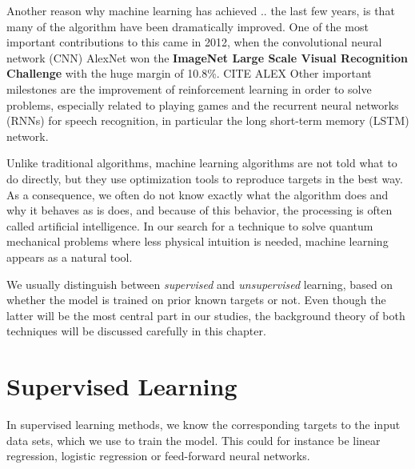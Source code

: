 Another reason why machine learning has achieved .. the last few years, is that many of the algorithm have been dramatically improved. One of the most important contributions to this came in 2012, when the convolutional neural network (CNN) AlexNet won the \textbf{ImageNet Large Scale Visual Recognition Challenge} with the huge margin of 10.8\%. CITE ALEX Other important milestones are the improvement of reinforcement learning in order to solve problems, especially related to playing games and the recurrent neural networks (RNNs) for speech recognition, in particular the long short-term memory (LSTM) network. 

Unlike traditional algorithms, machine learning algorithms are not told what to do directly, but they use optimization tools to reproduce targets in the best way. As a consequence, we often do not know exactly what the algorithm does and why it behaves as is does, and because of this behavior, the processing is often called artificial intelligence. In our search for a technique to solve quantum mechanical problems where less physical intuition is needed, machine learning appears as a natural tool.

We usually distinguish between \textit{supervised} and \textit{unsupervised} learning, based on whether the model is trained on prior known targets or not. Even though the latter will be the most central part in our studies, the background theory of both techniques will be discussed carefully in this chapter. 

\section{Supervised Learning}
In supervised learning methods, we know the corresponding targets to the input data sets, which we use to train the model. This could for instance be linear regression, logistic regression or feed-forward neural networks.

